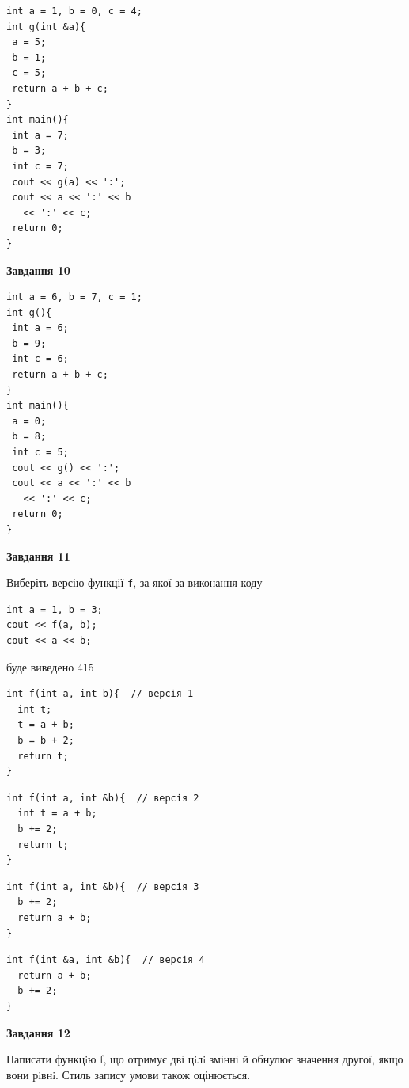 \documentclass[12pt, ukrainian]{article}
\def\code#1{\Verb!#1!}
\begin{document}
{\begin {large}
\begin{minipage}[t]{7.0cm}
\begin{verbatim}
int a = 1, b = 0, c = 4;
int g(int &a){
 a = 5;
 b = 1;
 c = 5;
 return a + b + c;
}
int main(){
 int a = 7;
 b = 3;
 int c = 7;
 cout << g(a) << ':';
 cout << a << ':' << b 
   << ':' << c;
 return 0;
}
\end{verbatim}



\begin{center}
\textbf{Завдання 10}
\end{center}
\vspace{-8mm}

\begin{verbatim}
int a = 6, b = 7, c = 1;
int g(){
 int a = 6;
 b = 9;
 int c = 6;
 return a + b + c;
}
int main(){
 a = 0;
 b = 8;
 int c = 5;
 cout << g() << ':';
 cout << a << ':' << b 
   << ':' << c;
 return 0;
}
\end{verbatim}

\end{minipage}
\vline \hspace{1mm}
\begin{minipage}[t]{11.0cm}

\begin{center}
\textbf{Завдання 11}
\end{center}
Виберіть версію функції \code{f}, за якої за виконання коду
\begin{verbatim}
int a = 1, b = 3;
cout << f(a, b);
cout << a << b;
\end{verbatim}

буде виведено 415

\begin{verbatim}
int f(int a, int b){  // версія 1
  int t;
  t = a + b;
  b = b + 2;
  return t;
}
\end{verbatim}

\vspace{-8mm}\begin{verbatim}
int f(int a, int &b){  // версія 2
  int t = a + b;
  b += 2;
  return t;
}
\end{verbatim}

\vspace{-8mm}\begin{verbatim}
int f(int a, int &b){  // версія 3
  b += 2;
  return a + b;
}
\end{verbatim}

\vspace{-8mm}\begin{verbatim}
int f(int &a, int &b){  // версія 4
  return a + b;
  b += 2;
}
\end{verbatim}



\begin{center}
\textbf{Завдання 12}
\end{center}

Написати функцiю f, що отримує дві цiлi змінні й обнулює значення другої, якщо вони рiвнi. Стиль запису умови також оцінюється.\par

\end{minipage}

\end {large}}
\newpage
\end{document}
